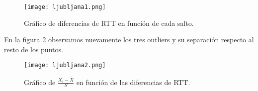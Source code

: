 \begin{figure}[H]
\centering
\texttt{[image: ljubljana1.png]}
\caption{Gráfico de diferencias de RTT en función de cada salto.}
\label{diff3}
\end{figure}

En la figura \ref{sdev3} observamos nuevamente los tres outliers y su separación respecto al resto de los puntos.

\begin{figure}[H]
\centering
\texttt{[image: ljubljana2.png]}
\caption{Gráfico de $\frac{X_i - \bar{X}}{S}$ en función de las diferencias de RTT.}
\label{sdev3}
\end{figure}